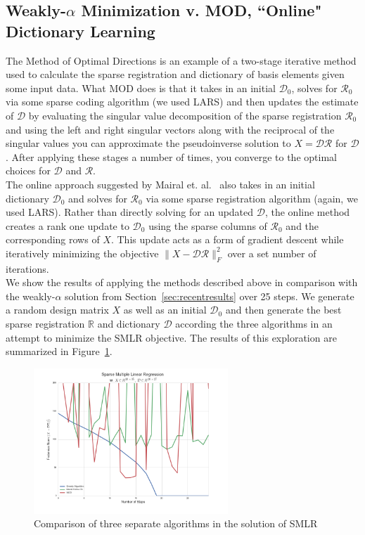 \documentclass{article}
\newcommand{\R}{\mathbb{R}}
\newcommand{\Rr}{\mathcal{R}}
\newcommand{\D}{\mathcal{D}}
\begin{document}
\subsection{Weakly-$\alpha$ Minimization v. MOD, ``Online" Dictionary Learning}

The Method of Optimal Directions is an example of a two-stage iterative method used to calculate the sparse registration and dictionary of basis elements given some input data. What MOD does is that it takes in an initial $\D_0$, solves for $\Rr_0$ via some sparse coding algorithm (we used LARS) and then updates the estimate of $\D$ by evaluating the singular value decomposition of the sparse registration $\Rr_0$ and using the left and right singular vectors along with the reciprocal of the singular values you can approximate the pseudoinverse solution to $X = \D\Rr$ for $\D$. After applying these stages a number of times, you converge to the optimal choices for $\D$ and $\Rr$.\\

\noindent The online approach suggested by Mairal et. al.~\cite{mairal09} also takes in an initial dictionary $\D_0$ and solves for $\Rr_0$ via some sparse registration algorithm (again, we used LARS). Rather than directly solving for an updated $\D$, the online method creates a rank one update to $\D_0$ using the sparse columns of $\Rr_0$ and the corresponding rows of $X$. This update acts as a form of gradient descent while iteratively minimizing the objective $\|X-\D\Rr\|_F^2$ over a set number of iterations.\\

\noindent We show the results of applying the methods described above in comparison with the weakly-$\alpha$ solution from Section~\ref{sec:recentresults} over 25 steps. We generate a random design matrix $X$ as well as an initial $\D_0$ and then generate the best sparse registration $\R$ and dictionary $\D$ according the three algorithms in an attempt to minimize the SMLR objective. The results of this exploration are summarized in Figure~\ref{fig:smlr}.

\begin{figure}[ht!]
\centering
\includegraphics[width=0.65\textwidth]{src/sparse_MLR_greedy_online.png}
\caption{Comparison of three separate algorithms in the solution of SMLR}
\label{fig:smlr}
\end{figure}
\end{document}
